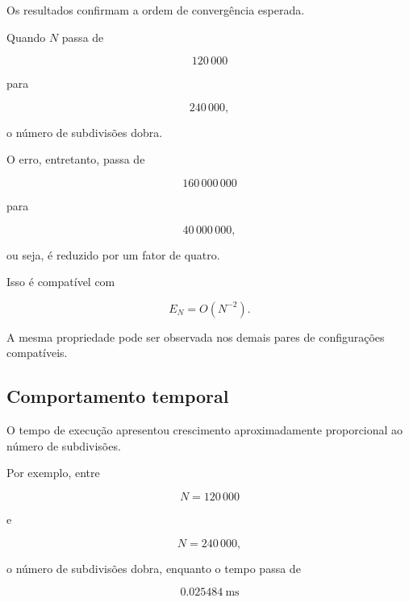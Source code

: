 Os resultados confirmam a ordem de convergência esperada.

Quando \(N\) passa de

\begin{equation}
    120\,000
\end{equation}

para

\begin{equation}
    240\,000,
\end{equation}

o número de subdivisões dobra.

O erro, entretanto, passa de

\begin{equation}
    160\,000\,000
\end{equation}

para

\begin{equation}
    40\,000\,000,
\end{equation}

ou seja, é reduzido por um fator de quatro.

Isso é compatível com

\begin{equation}
    E_N=O(N^{-2}).
\end{equation}

A mesma propriedade pode ser observada nos demais pares de configurações
compatíveis.

\subsection{Comportamento temporal}

O tempo de execução apresentou crescimento aproximadamente proporcional ao
número de subdivisões.

Por exemplo, entre

\begin{equation}
    N=120\,000
\end{equation}

e

\begin{equation}
    N=240\,000,
\end{equation}

o número de subdivisões dobra, enquanto o tempo passa de

\begin{equation}
    0.025484\ \text{ms}
\end{equation}

